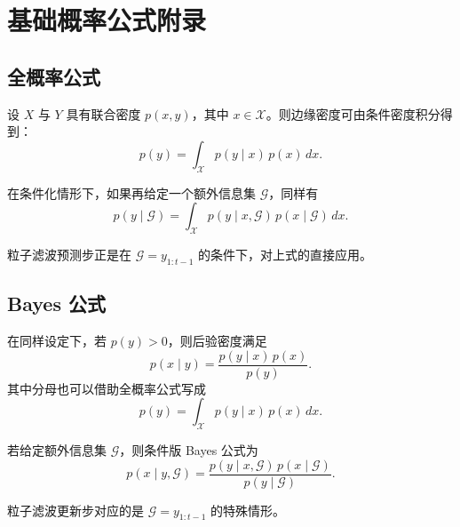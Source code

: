 \documentclass[12pt,a4paper]{ctexart}
\begin{document}
\section{基础概率公式附录}

\subsection{全概率公式}\label{app:total-prob}

设 \(X\) 与 \(Y\) 具有联合密度 \(p(x,y)\)，其中 \(x \in \mathcal X\)。则边缘密度可由条件密度积分得到：
\[
p(y) = \int_{\mathcal X} p(y \mid x)\, p(x)\, dx.
\]

在条件化情形下，如果再给定一个额外信息集 \(\mathcal G\)，同样有
\[
p(y \mid \mathcal G)
= \int_{\mathcal X} p(y \mid x,\mathcal G)\, p(x \mid \mathcal G)\, dx.
\]

粒子滤波预测步正是在 \(\mathcal G = y_{1:t-1}\) 的条件下，对上式的直接应用。

\subsection{Bayes 公式}\label{app:bayes-formula}

在同样设定下，若 \(p(y) > 0\)，则后验密度满足
\[
p(x \mid y) = \frac{p(y \mid x)\, p(x)}{p(y)}.
\]
其中分母也可以借助全概率公式写成
\[
p(y) = \int_{\mathcal X} p(y \mid x)\, p(x)\, dx.
\]

若给定额外信息集 \(\mathcal G\)，则条件版 Bayes 公式为
\[
p(x \mid y,\mathcal G)
= \frac{p(y \mid x,\mathcal G)\, p(x \mid \mathcal G)}
{p(y \mid \mathcal G)}.
\]

粒子滤波更新步对应的是 \(\mathcal G = y_{1:t-1}\) 的特殊情形。
\end{document}
